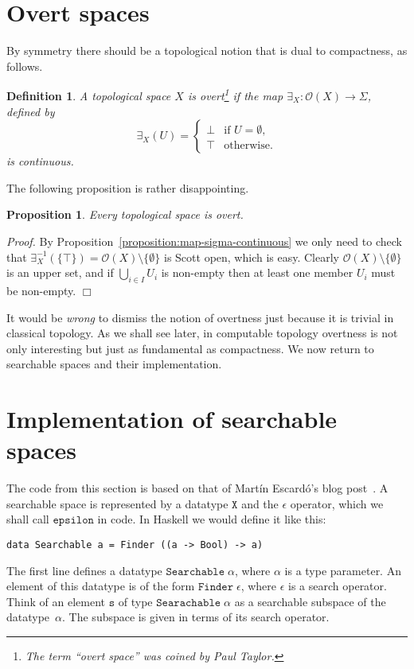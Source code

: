 \documentclass[a4paper,10pt]{article}
\newtheorem{proposition}[theorem]{Proposition}
\newtheorem{definition}[theorem]{Definition}
\newenvironment{proof}{\par\noindent\textit{Proof.}}{\hfill$\Box$\par\medskip}
\newcommand{\set}[1]{\{#1\}}
\newcommand{\tpl}[1]{\mathcal{O}(#1)}
\newcommand{\R}[1]{\mathtt{#1}}
\begin{document}
\section{Overt spaces}
\label{sec:overt-spaces}

By symmetry there should be a topological notion that is dual to compactness,
as follows.

\begin{definition} A topological space $X$ is \emph{overt}\footnote{The term
``overt space'' was coined by Paul Taylor.} if the map $\exists_X : \tpl{X}
\to \Sigma$, defined by
  \begin{equation*} \exists_X (U) =
    \begin{cases} \bot & \text{if $U = \emptyset$,}\\ \top & \text{otherwise.}
    \end{cases}
  \end{equation*}
  is continuous.
\end{definition}

The following proposition is rather disappointing.

\begin{proposition} Every topological space is overt.
\end{proposition}

\begin{proof} By Proposition~\ref{proposition:map-sigma-continuous} we only
need to check that $\exists_X^{-1}(\set{\top}) = \tpl{X} \setminus
\set{\emptyset}$ is Scott open, which is easy. Clearly $\tpl{X} \setminus
\set{\emptyset}$ is an upper set, and if $\bigcup_{i \in I} U_i$ is non-empty
then at least one member $U_i$ must be non-empty.
\end{proof}

It would be \emph{wrong} to dismiss the notion of overtness just because it is
trivial in classical topology. As we shall see later, in computable topology
overtness is not only interesting but just as fundamental as compactness. We
now return to searchable spaces and their implementation.

\section{Implementation of searchable spaces}
\label{sec:implementation-searchable}

The code from this section is based on that of Martín Escardó's blog
post~\cite{escardo08:blog}. A searchable space is represented by a datatype
$\mathtt{X}$ and the $\epsilon$ operator, which we shall call $\R{epsilon}$ in
code. In Haskell we would define it like this:
% 
\begin{lstlisting}
data Searchable a = Finder ((a -> Bool) -> a)
\end{lstlisting}
% 
The first line defines a datatype $\mathtt{Searchable}\;\alpha$, where
$\alpha$ is a type parameter. An element of this datatype is of the
form $\mathtt{Finder}\;\epsilon$, where $\epsilon$ is a search
operator. Think of an element $\R{s}$ of type
$\mathtt{Searachable}\;\alpha$ as a searchable subspace of the
datatype~$\alpha$. The subspace is given in terms of its search
operator.
\end{document}
